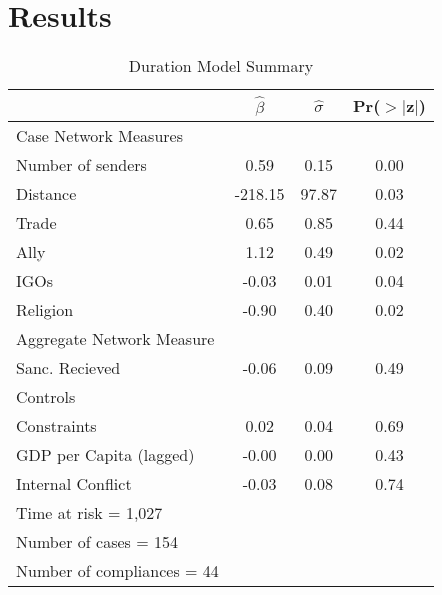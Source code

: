 \section{Results}
\label{Results} 
\begin{table}[ht]
		\begin{center}
		\begin{tabular}{lccc}
		\caption{Duration Model Summary}
		  \hline\hline
		 &$\hat{\beta}$&$\hat{\sigma}$& Pr($>$$|$z$|$) \\ 
		  \hline
		  Case Network Measures \\
		  \;\;\;   Number of senders & 0.59 & 0.15 & 0.00 \\ 
		  \;\;\;   Distance & -218.15 & 97.87 & 0.03 \\
		  \;\;\;   Trade & 0.65 & 0.85 & 0.44 \\ 
		  \;\;\;   Ally & 1.12 & 0.49 & 0.02 \\ 
		  \;\;\;   IGOs & -0.03 & 0.01 & 0.04 \\ 
		  \;\;\;   Religion & -0.90 & 0.40 & 0.02 \\ 
		  Aggregate Network Measure \\
		  \;\;\;   Sanc. Recieved & -0.06 & 0.09 & 0.49 \\ 
		  Controls \\
		  \;\;\;   Constraints & 0.02 & 0.04 & 0.69 \\ 		  
		  \;\;\;   GDP per Capita (lagged) & -0.00 & 0.00 & 0.43 \\ 
		  \;\;\;   Internal Conflict & -0.03 & 0.08 & 0.74 \\ 
		   \hline
		   Time at risk = 1,027 &&&\\
			 Number of cases = 154 &&&\\
		   Number of compliances = 44 &&&\\
		  \hline\hline
		\end{tabular}
		\end{center}
\end{table}


